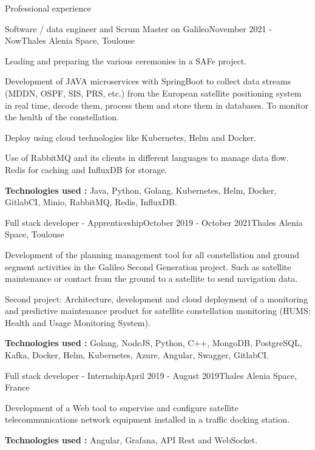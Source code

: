 \documentclass[
	10pt, %
]{resume}
\begin{document}

\begin{rSection}{Professional experience}

	\begin{rSubsection}{Software / data engineer and Scrum Master on Galileo}{November 2021 - Now}{Thales Alenia Space, Toulouse}{}
		\item Leading and preparing the various ceremonies in a SAFe project.
		\item Development of JAVA microservices with SpringBoot to collect data streams (MDDN, OSPF, SIS, PRS, etc.) from the European satellite positioning system in real time, decode them, process them and store them in databases. To monitor the health of the constellation.
 		\item Deploy using cloud technologies like Kubernetes, Helm and Docker.
 		\item Use of RabbitMQ and its clients in different languages to manage data flow. Redis for caching and InfluxDB for storage.
		\item \textbf{Technologies used :} Java, Python, Golang, Kubernetes, Helm, Docker, GitlabCI, Minio, RabbitMQ, Redis, InfluxDB.
	\end{rSubsection}

	\begin{rSubsection}{Full stack developer - Apprenticeship}{October 2019 - October 2021}{Thales Alenia Space, Toulouse}{}
		\item Development of the planning management tool for all constellation and ground segment activities in the Galileo Second Generation project. Such as satellite maintenance or contact from the ground to a satellite to send navigation data.
		\item Second project: Architecture, development and cloud deployment of a monitoring and predictive maintenance product for satellite constellation monitoring (HUMS: Health and Usage Monitoring System).
		\item \textbf{Technologies used :} Golang, NodeJS, Python, C++, MongoDB, PostgreSQL, Kafka, Docker, Helm, Kubernetes, Azure, Angular, Swagger, GitlabCI.
	\end{rSubsection}

	\begin{rSubsection}{Full stack developer - Internship}{April 2019 - August 2019}{Thales Alenia Space, France}{}
		\item Development of a Web tool to supervise and configure satellite telecommunications network equipment installed in a traffic docking station.
		\item \textbf{Technologies used :} Angular, Grafana, API Rest and WebSocket.
	\end{rSubsection}


\end{rSection}
\end{document}
